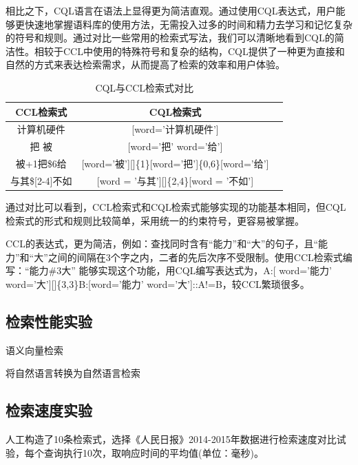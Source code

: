 \documentclass[11pt]{article}
\begin{document}
\begin{CJK*}{UTF8}{gbsn}
相比之下，CQL语言在语法上显得更为简洁直观。通过使用CQL表达式，用户能够更快速地掌握语料库的使用方法，无需投入过多的时间和精力去学习和记忆复杂的符号和规则。通过对比一些常用的检索式写法，我们可以清晰地看到CQL的简洁性。相较于CCL中使用的特殊符号和复杂的结构，CQL提供了一种更为直接和自然的方式来表达检索需求，从而提高了检索的效率和用户体验。


\begin{table}[h]
	\begin{center}
		\begin{tabular}{|c|c|c|}
			\hline \bf CCL检索式 & \bf CQL检索式 \\ \hline
			计算机硬件 & [word='计算机硬件'] \\
			把 \textbar 被 & [word='把' \textbar word='给'] \\
			被+1把\$6给 & [word='被'][]\{1\}[word='把']\{0,6\}[word='给'] \\
			与其\$[2-4]不如 & [word = '与其'][]\{2,4\}[word = '不如'] \\
			
			\hline
		\end{tabular}
	\end{center}
	\caption{\label{font-table} CQL与CCL检索式对比}
\end{table}

通过对比可以看到，CCL检索式和CQL检索式能够实现的功能基本相同，但CQL检索式的形式和规则比较简单，采用统一的约束符号，更容易被掌握。

CCL的表达式，更为简洁，例如：查找同时含有“能力”和“大”的句子，且“能力”和“大”之间的间隔在3个字之内，二者的先后次序不受限制。使用CCL检索式编写：“能力\#3大” 能够实现这个功能，用CQL编写表达式为，A:[ word='能力' \textbar word='大'][]\{3,3\}B:[word='能力' \textbar word='大']::A!=B，较CCL繁琐很多。

\subsection{检索性能实验}

语义向量检索

将自然语言转换为自然语言检索


\subsection{检索速度实验}

人工构造了10条检索式，选择《人民日报》2014-2015年数据进行检索速度对比试验，每个查询执行10次，取响应时间的平均值(单位：毫秒)。


\end{CJK*}
\end{document}
